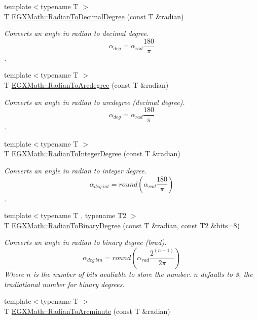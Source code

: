 \begin{DoxyCompactItemize}
{\footnotesize template$<$typename T $>$ }\\T \mbox{\hyperlink{group___e_g_x_math-_angle_conversions-_radian_ga6d170f1882c32de53167c04524d05f67}{E\+G\+X\+Math\+::\+Radian\+To\+Decimal\+Degree}} (const T \&radian)
\begin{DoxyCompactList}\small\item\em Converts an angle in radian to decimal degree. \[\alpha_{deg}=\alpha_{rad}\frac{180}{\pi}\]. \end{DoxyCompactList}\item 
{\footnotesize template$<$typename T $>$ }\\T \mbox{\hyperlink{group___e_g_x_math-_angle_conversions-_radian_ga3dfdc97357cc07f8379976bbc08f9852}{E\+G\+X\+Math\+::\+Radian\+To\+Arcdegree}} (const T \&radian)
\begin{DoxyCompactList}\small\item\em Converts an angle in radian to arcdegree (decimal degree). \[\alpha_{deg}=\alpha_{rad}\frac{180}{\pi}\]. \end{DoxyCompactList}\item 
{\footnotesize template$<$typename T $>$ }\\T \mbox{\hyperlink{group___e_g_x_math-_angle_conversions-_radian_gac84796dfdeb56235e1e338522a5f9350}{E\+G\+X\+Math\+::\+Radian\+To\+Integer\+Degree}} (const T \&radian)
\begin{DoxyCompactList}\small\item\em Converts an angle in radian to integer degree. \[\alpha_{deg\ int}=round(\alpha_{rad}\frac{180}{\pi})\]. \end{DoxyCompactList}\item 
{\footnotesize template$<$typename T , typename T2 $>$ }\\T \mbox{\hyperlink{group___e_g_x_math-_angle_conversions-_radian_ga13311d9b6977d514f1d6c336e7c0162b}{E\+G\+X\+Math\+::\+Radian\+To\+Binary\+Degree}} (const T \&radian, const T2 \&bits=8)
\begin{DoxyCompactList}\small\item\em Converts an angle in radian to binary degree (brad). \[\alpha_{deg\ bin}=round(\alpha_{rad}\frac{2^(n-1)}{2 \pi})\] Where $n$ is the number of bits avaliable to store the number. $n$ defaults to 8, the tradiational number for binary degrees. \end{DoxyCompactList}\item 
{\footnotesize template$<$typename T $>$ }\\T \mbox{\hyperlink{group___e_g_x_math-_angle_conversions-_radian_ga722e3b8e78540a6b3942b73b64aeb8d2}{E\+G\+X\+Math\+::\+Radian\+To\+Arcminute}} (const T \&radian)

\end{DoxyCompactItemize}
